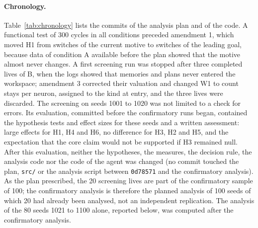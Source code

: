 \documentclass[11pt,a4paper]{article}
\newcommand{\code}[1]{\texttt{#1}}
\begin{document}
\paragraph{Chronology.} Table~\ref{tab:chronology} lists the commits of the analysis plan and of the code. A functional test of 300 cycles in all conditions preceded amendment 1, which moved H1 from switches of the current motive to switches of the leading goal, because data of condition A available before the plan showed that the motive almost never changes. A first screening run was stopped after three completed lives of B, when the logs showed that memories and plans never entered the workspace; amendment 3 corrected their valuation and changed W1 to count stays per neuron, assigned to the kind at entry, and the three lives were discarded. The screening on seeds 1001 to 1020 was not limited to a check for errors. Its evaluation, committed before the confirmatory runs began, contained the hypothesis tests and effect sizes for these seeds and a written assessment: large effects for H1, H4 and H6, no difference for H3, H2 and H5, and the expectation that the core claim would not be supported if H3 remained null. After this evaluation, neither the hypotheses, the measures, the decision rule, the analysis code nor the code of the agent was changed (no commit touched the plan, \code{src/} or the analysis script between \code{0d78571} and the confirmatory analysis). As the plan prescribed, the 20 screening lives are part of the confirmatory sample of 100; the confirmatory analysis is therefore the planned analysis of 100 seeds of which 20 had already been analysed, not an independent replication. The analysis of the 80 seeds 1021 to 1100 alone, reported below, was computed after the confirmatory analysis.
\end{document}
